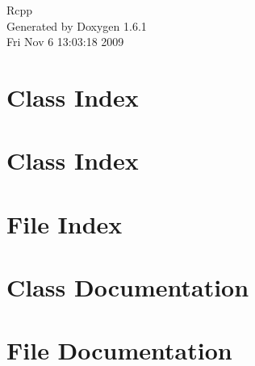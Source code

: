\documentclass[a4paper]{book}
\begin{document}
\hypersetup{pageanchor=false}
\begin{titlepage}
\vspace*{7cm}
\begin{center}
{\Large Rcpp }\\
\vspace*{1cm}
{\large Generated by Doxygen 1.6.1}\\
\vspace*{0.5cm}
{\small Fri Nov 6 13:03:18 2009}\\
\end{center}
\end{titlepage}
\clearemptydoublepage
{}
\tableofcontents
\clearemptydoublepage
{}
\hypersetup{pageanchor=true}
\chapter{Class Index}

\chapter{Class Index}

\chapter{File Index}

\chapter{Class Documentation}



















\chapter{File Documentation}





\printindex
\end{document}
